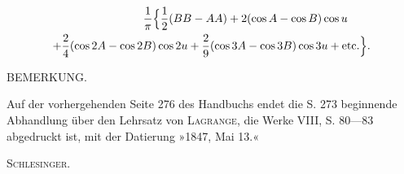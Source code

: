 \[
\begin{aligned}
\frac1\pi\Bigl\{\frac12(BB-AA)+2(\cos A-\cos B)\cos u\qquad\\
+\frac24(\cos2A-\cos2B)\cos2u+\frac29(\cos3A-\cos3B)\cos3u+\text{etc.}\Bigr\}.
\end{aligned}
\]
\begin{center}BEMERKUNG.\end{center}
{\small\noindent\hspace*{\parindent}Auf der vorhergehenden Seite 276 des Handbuchs endet die S. 273 beginnende Abhandlung über den Lehrsatz von \textsc{Lagrange}, die Werke VIII, S. 80—83 abgedruckt ist, mit der Datierung »1847, Mai 13.«\par}
\begin{flushright}\textsc{Schlesinger}.\end{flushright}
\ClosingRule

